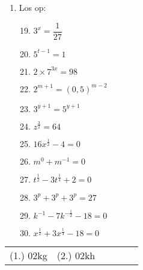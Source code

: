\begin{eocexercises}{}
\begin{enumerate}[label=\textbf{\arabic*}., itemsep=5pt]
\item Los op:
    \begin{multicols}{2}
      \begin{enumerate}[label=\textbf{(\alph*)}, itemsep=7pt]
        \setcounter{enumi}{18}
      \item $ 3^x = \dfrac{1}{27} $
      \item $ 5^{t-1} = 1 $
      \item $ 2 \times 7^{3x} = 98 $
      \item $ 2^{m+1} = (0,5)^{m-2}$
      \item $ 3^{y+1} = 5^{y+1} $
      \item $ z^{\frac{3}{2}} = 64 $
      \item $ 16x^{\frac{1}{2}} - 4 = 0 $
      \item $ m^0 + m^{-1} = 0 $
      \item $ t^{\frac{1}{2}} - 3t^{\frac{1}{4}} + 2 = 0 $
      \item $ 3^p + 3^p + 3^p = 27 $
      \item $ k^{-1} - 7k^{-\frac{1}{2}} -18 = 0 $
      \item $ x^{\frac{1}{2}}+3x^{\frac{1}{4}}-18 = 0 $
      \end{enumerate}
    \end{multicols}
  \end{enumerate}
\end{eocexercises}

\par \practiceinfo
\par \begin{tabular}[h]{cccccc}
(1.)	02kg	&
(2.)	02kh	&
\end{tabular}

